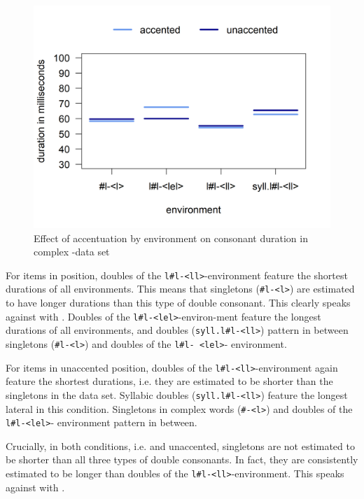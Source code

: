 \begin{figure}
	
	\includegraphics [scale=0.5] {images/Experiment/LyModelInterEnvAcc}
	\caption{Effect of accentuation by environment on consonant duration in complex -data set}
	\label{fig:Env Acc lyComplex experiment}
\end{figure}

For items in  position, doubles of the \texttt{l\#l-<ll>}-environment feature the shortest durations of all environments. This means that singletons (\texttt{\#l-<l>}) are estimated to have longer durations than this type of double consonant. This clearly speaks against  with . Doubles of the \texttt{l\#l-<lel>}-environ-ment feature the longest durations of all environments, and  doubles (\texttt{syll.l\#l-<ll>}) pattern in between singletons  (\texttt{\#l-<l>}) and doubles of the \texttt{l\#l- <lel>}- environment.


For items in unaccented position, doubles of the \texttt{l\#l-<ll>}-environment again feature the shortest durations, i.e. they are estimated to be shorter than the singletons in the data set. Syllabic doubles (\texttt{syll.l\#l-<ll>}) feature the longest lateral in this condition.  Singletons in complex words (\texttt{\#-<l>}) and doubles of the \texttt{l\#l-<lel>}- environment  pattern in between.

Crucially, in both conditions, i.e.  and unaccented, singletons are not estimated to be shorter than all three types of double consonants. In fact, they are consistently estimated to be longer than doubles of the  \texttt{l\#l-<ll>}-environment. This speaks against  with .


